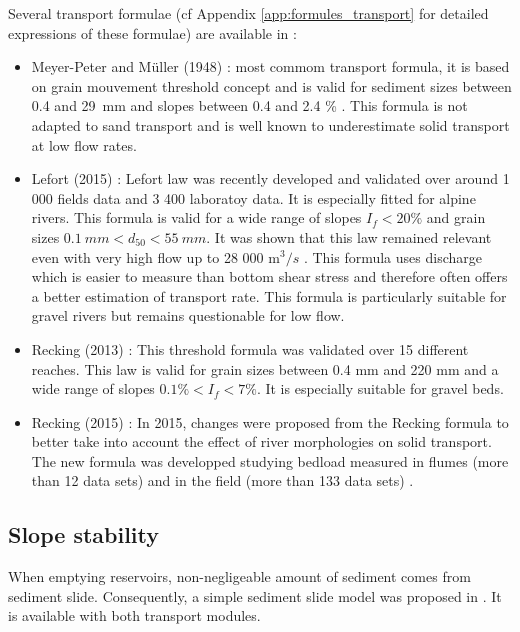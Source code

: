 Several transport formulae (cf Appendix \ref{app:formules_transport} for detailed expressions of these formulae) are available in \Cbedload :
\begin{itemize}
	\item Meyer-Peter and Müller (1948) \cite{MPM} : most commom transport formula, it is based on grain mouvement threshold concept and is valid for sediment sizes between 0.4 and \mbox{29 mm} and slopes between 0.4 and 2.4 \% \cite{lois_validite_recking}. This formula is not adapted to sand transport and is well known to underestimate solid transport at low flow rates. 
	\item Lefort (2015) : Lefort \cite{lefort} law was recently developed and validated over around 1 000 fields data and 3 400 laboratoy data. It is especially fitted for alpine rivers. This formula is valid for a wide range of slopes $I_f < 20\%$ and grain sizes $0.1\ mm < d_{50} < 55\ mm$. It was shown that this law remained relevant even with very high flow up to 28 000 m$^3/s$ \cite{lois_validite_recking}. This formula uses discharge which is easier to measure than bottom shear stress and therefore often offers a better estimation of transport rate. This formula is particularly suitable for gravel rivers but remains questionable for low flow.
	\item Recking (2013) \cite{recking2013} : This threshold formula was validated over 15 different reaches. This law is valid for grain sizes between 0.4 mm and 220 mm and a wide range of slopes $0.1\% < I_f < 7\%$\cite{lois_validite_recking}. It is especially suitable for gravel beds. 
	\item Recking (2015) \cite{recking2015}: In 2015, changes were proposed from the Recking formula to better take into account the effect of river morphologies on solid transport. The new formula was developped studying bedload measured in flumes (more than 12 data sets) and in the field (more than 133 data sets) \cite{recking2015}. 
\end{itemize}

\subsection{Slope stability}
\label{talus_th}

When emptying reservoirs, non-negligeable amount of sediment comes from sediment slide. Consequently, a simple sediment slide model was proposed in \courlis. It is available with both transport modules.

